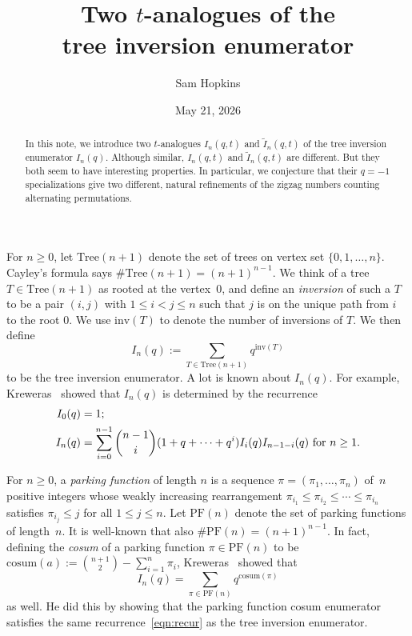 \documentclass[11pt]{amsart}
\title[Two $t$-analogues of the tree inversion enumerator]{Two $t$-analogues of the\\ tree inversion enumerator}
\author{Sam Hopkins}\emailhref{samuelfhopkins@gmail.com}
\date{May 21, 2026}
\begin{document}
\begin{abstract}
In this note, we introduce two $t$-analogues $I_n(q,t)$ and $\widetilde{I}_n(q,t)$ of the tree inversion enumerator $I_n(q)$. Although similar, $I_n(q,t)$ and $\widetilde{I}_n(q,t)$ are different. But they both seem to have interesting properties. In particular, we conjecture that their $q=-1$ specializations give two different, natural refinements of the zigzag numbers counting alternating permutations.
\end{abstract}

\maketitle

For $n \geq 0$, let $\mathrm{Tree}(n+1)$ denote the set of trees on vertex set $\{0,1,\ldots,n\}$. Cayley's formula says $\#\mathrm{Tree}(n+1)=(n+1)^{n-1}$. We think of a tree $T \in \mathrm{Tree}(n+1)$ as rooted at the vertex~$0$, and define an \emph{inversion} of such a $T$ to be a pair $(i,j)$ with $1 \leq i < j \leq n$ such that $j$ is on the unique path from $i$ to the root $0$. We use $\mathrm{inv}(T)$ to denote the number of inversions of $T$. We then define
\begin{equation} \label{eq:inv_enum_tree}
    I_n(q) := \sum_{T\in \mathrm{Tree}(n+1)}q^{\mathrm{inv}(T)}
\end{equation}
to be the tree inversion enumerator. A lot is known about $I_n(q)$. For example, Kreweras~\cite{kreweras1980famille} showed that $I_n(q)$ is determined by the recurrence
\begin{align} \label{eqn:recur}
\notag I_0(q) &= 1;\\
 I_n(q) &= \sum_{i=0}^{n-1}\binom{n-1}{i}(1+q+\cdots+q^{i})I_i(q)I_{n-1-i}(q) \textrm{ for $n\geq 1$}.
\end{align}

For $n \geq 0$, a \emph{parking function} of length $n$ is a sequence $\pi=(\pi_1,\ldots,\pi_n)$ of~$n$ positive integers whose weakly increasing rearrangement $\pi_{i_1}\leq\pi_{i_2}\leq\cdots\leq\pi_{i_n}$ satisfies $\pi_{i_j} \leq j$ for all $1\leq j \leq n$. Let $\mathrm{PF}(n)$ denote the set of parking functions of length~$n$. It is well-known that also $\#\mathrm{PF}(n)=(n+1)^{n-1}$. In fact, defining the \emph{cosum} of a parking function $\pi\in\mathrm{PF}(n)$ to be $\mathrm{cosum}(a):=\binom{n+1}{2}-\sum_{i=1}^{n}\pi_i$, Kreweras~\cite{kreweras1980famille} showed that
\begin{equation} \label{eq:inv_enum_pf}
    I_n(q)=\sum_{\pi\in\mathrm{PF}(n)}q^{\mathrm{cosum}(\pi)}
\end{equation}
as well. He did this by showing that the parking function cosum enumerator satisfies the same recurrence~\eqref{eqn:recur} as the tree inversion enumerator.
\end{document}
